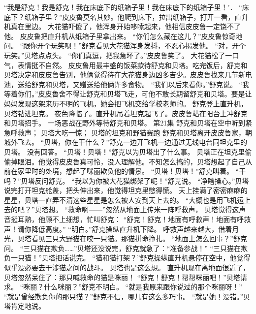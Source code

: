 \documentclass[a4paper,12pt,UTF8,twoside]{ctexbook}
\begin{document}
        “我是舒克！我是舒克！我在床底下的纸箱子里！我在床底下的纸箱子里！'． 
        “床底下？纸箱子里？”皮皮鲁莫名其妙。他爬到床下，拉出纸箱子，打开一看，直升机真在里边。 
        大花猫吓傻了，他浑身开始哆嗦起来，他相信皮皮鲁一定饶不了他。 
        皮皮鲁把直升机从纸箱子里拿出来。 
        “你们怎么藏在这儿？”皮皮鲁惊奇地问。 
        “跟你开个玩笑呗！”舒克看见大花猫浑身发抖，不忍心揭发他。 
        “对，开个玩笑。”贝塔点点头。 
        “你们真逗，把我急坏了。”皮皮鲁笑了。 
        大花猫松了一口气，表情挺不自然。 
        皮皮鲁用最丰盛的饭菜款待舒克和贝塔。吃完饭后，舒克和贝塔决定和皮皮鲁告别，他俩觉得待在大花猫身边凶多吉少。皮皮鲁找来几节新电池，送给舒克和贝塔，又赠送给他俩许多食物。 
        “我们以后来看你。”舒克说。 
        “我等着你们。”皮皮鲁舍不得让舒克和贝塔飞走，可他不敢长期留舒克和贝塔。要是让妈妈发现这架来历不明的飞机，她会把飞机交给学校老师的。 
        舒克登上直升机，贝塔钻进坦克。 
        夜色降临了。直升机吊着坦克起飞了。皮皮鲁站在阳台上冲舒克和贝塔招手。 
        一场恶战在野外等待舒克和贝塔。   第21集 
        舒克和贝塔在空中听到紧急呼救声； 
        贝塔大吃一惊； 
        贝塔的坦克和野猫赛跑   
        舒克和贝塔离开皮皮鲁家，朝城外飞去。 
        “贝塔，你在干什么？”舒克一边开飞机一边通过无线电台同坦克里的贝塔。 
        没有回答。 
        “贝塔！贝塔！”舒克以为贝塔出了什么事。 
        贝塔正在坦克里偷偷掉眼泪。他觉得皮皮鲁真可怜，没人理解他。不知怎么搞的，贝塔想起了自己从前在家里时的处境，想起了咪丽欺负他的情景。 
        “贝塔！贝塔！”舒克叫着。 
        “干吗？”贝塔反问舒克。 
        “我以为你被大花猫绑架了呢！”舒克说。 
        “净瞎操心。”贝塔说完打开坦克舱盖，把头伸出来，他觉得坦克里憋得慌。 
        天上挂满了密密麻麻的星星，贝塔一直弄不清这些星星是怎么被人安到天上去的。 
        “大概也是用飞机运上去的吧？”贝塔想。 
        “救命啊——”忽然从地面上传米一阵呼救声， 
        贝塔觉得这声音挺耳熟，他顾不上细想，忙叫舒克： 
        “舒克！舒克！地面有呼救声！地面有呼救声！请你降低高度。” 
        “明白。”舒克操纵直升机下降。 
        呼救声越来越大，借着月光，贝塔看见三只大野猫在咬一只猫。那猫拼命挣扎。 
        “地面上怎么回事？”舒克问。 
        “三只猫在欺负……”贝塔还没说完，舒克就急了：“准备参战！” 
        “三只猫在欺负一只猫！”贝塔把话说完。 
        “猫和猫打架？”舒克操纵直升机悬停在空中，他觉得似乎没必要去干涉猫之间的战斗。 
        贝塔也是这么想。 
        直升机现在离地面很近了，贝塔忽然呆住了：那只喊救命的猫是咪丽！ 
        “舒克！舒克！帮帮咪丽吧！”贝塔请求。 
        “咪丽？什么咪丽？”舒克不明白。 
        “就是我原来跟你说过的那个咪丽呀！” 
        “就是曾经欺负你的那只猫？”舒克不信，哪儿有这么多巧事。 
        “就是她！没错。”贝塔肯定地说。 
\end{document}

